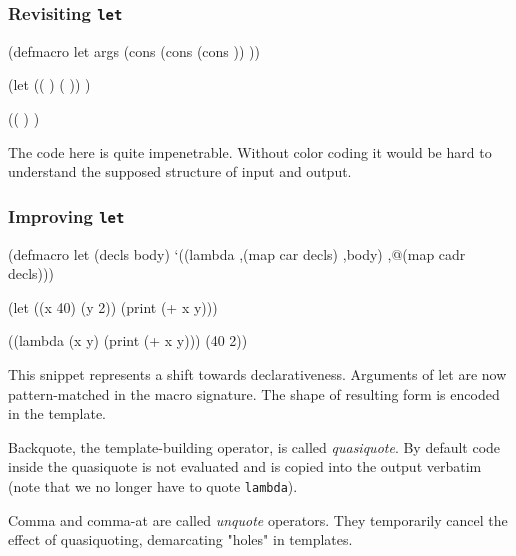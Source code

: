 \documentclass[hyperref={bookmarks=false}]{beamer}
\begin{document}
\begin{frame}[fragile]
\frametitle{Revisiting \texttt{let}}

\begin{lstlistinglike}
\begin{semiverbatim}
(defmacro let args
  (cons
   (cons \text{\color{blue}{'lambda}}
         (cons \text{\color{red}{(map car (car args))}}
               \text{\color{violet}{(cdr args)}}))
   \text{\color{teal}{(map cadr (car args))}}))

(let ((\text{\color{red}{x}} \text{\color{teal}{40}}) (\text{\color{red}{y}} \text{\color{teal}{2}})) \text{\color{violet}{(print (+ x y))}})

((\text{\color{blue}{lambda}} \text{\color{red}{(x y)}} \text{\color{violet}{(print (+ x y))}}) \text{\color{teal}{(40 2)}})
\end{semiverbatim}
\end{lstlistinglike}

The code here is quite impenetrable.
Without color coding it would be hard to understand the supposed structure of input and output.
\end{frame}

\begin{frame}[fragile]
\frametitle{Improving \texttt{let}}

\begin{lstlistinglike}
\begin{semiverbatim}
(defmacro let (decls body)
  \alert{`}((lambda \alert{,}(map car decls) \alert{,}body) \alert{,@}(map cadr decls)))

(let ((x 40) (y 2)) (print (+ x y)))

((lambda (x y) (print (+ x y))) (40 2))
\end{semiverbatim}
\end{lstlistinglike}

This snippet represents a shift towards declarativeness.
Arguments of let are now pattern-matched in the macro signature.
The shape of resulting form is encoded in the template.

Backquote, the template-building operator, is called \emph{quasiquote}.
By default code inside the quasiquote is not evaluated and is copied into the output verbatim
(note that we no longer have to quote \texttt{lambda}).

Comma and comma-at are called \emph{unquote} operators.
They temporarily cancel the effect of quasiquoting, demarcating "holes" in templates.
\end{frame}
\end{document}

